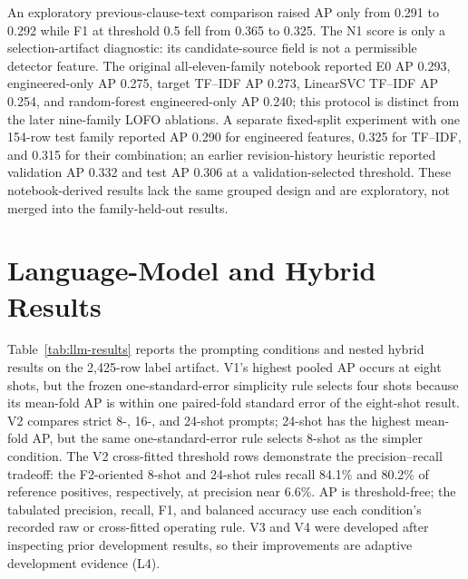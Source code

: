 \documentclass[12pt,a4paper,oneside]{report}
\begin{document}
An exploratory previous-clause-text comparison raised AP only from 0.291 to 0.292 while F1 at threshold 0.5 fell from 0.365 to 0.325. The N1 score is only a selection-artifact diagnostic: its candidate-source field is not a permissible detector feature. The original all-eleven-family notebook reported E0 AP 0.293, engineered-only AP 0.275, target TF--IDF AP 0.273, LinearSVC TF--IDF AP 0.254, and random-forest engineered-only AP 0.240; this protocol is distinct from the later nine-family LOFO ablations. A separate fixed-split experiment with one 154-row test family reported AP 0.290 for engineered features, 0.325 for TF--IDF, and 0.315 for their combination; an earlier revision-history heuristic reported validation AP 0.332 and test AP 0.306 at a validation-selected threshold. These notebook-derived results lack the same grouped design and are exploratory, not merged into the family-held-out results.

\section{Language-Model and Hybrid Results}
\label{sec:llm-results}

Table~\ref{tab:llm-results} reports the prompting conditions and nested hybrid results on the 2,425-row label artifact. V1's highest pooled AP occurs at eight shots, but the frozen one-standard-error simplicity rule selects four shots because its mean-fold AP is within one paired-fold standard error of the eight-shot result. V2 compares strict 8-, 16-, and 24-shot prompts; 24-shot has the highest mean-fold AP, but the same one-standard-error rule selects 8-shot as the simpler condition. The V2 cross-fitted threshold rows demonstrate the precision--recall tradeoff: the F2-oriented 8-shot and 24-shot rules recall 84.1\% and 80.2\% of reference positives, respectively, at precision near 6.6\%. AP is threshold-free; the tabulated precision, recall, F1, and balanced accuracy use each condition's recorded raw or cross-fitted operating rule. V3 and V4 were developed after inspecting prior development results, so their improvements are adaptive development evidence (L4).
\end{document}
